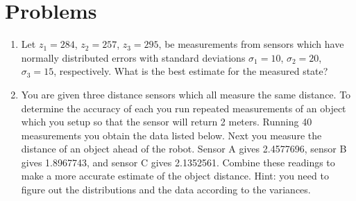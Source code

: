 \hypertarget{problems}{%
\section{Problems}\label{problems}}

\begin{enumerate}
\item
  Let \(z_1 = 284\), \(z_2 = 257\), \(z_3 = 295\), be measurements from
  sensors which have normally distributed errors with standard
  deviations \(\sigma_1 = 10\), \(\sigma_2 = 20\), \(\sigma_3 = 15\),
  respectively. What is the best estimate for the measured state?
\item
  You are given three distance sensors which all measure the same
  distance. To determine the accuracy of each you run repeated
  measurements of an object which you setup so that the sensor will
  return 2 meters. Running 40 measurements you obtain the data listed
  below. Next you measure the distance of an object ahead of the robot.
  Sensor A gives 2.4577696, sensor B gives 1.8967743, and sensor C gives
  2.1352561. Combine these readings to make a more accurate estimate of
  the object distance. Hint: you need to figure out the distributions
  and the data according to the variances.


\end{enumerate}
